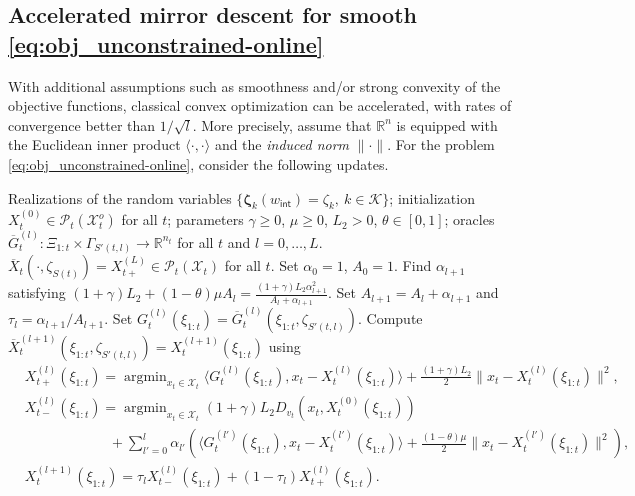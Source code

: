 \documentclass[11pt,fullpage,letterpaper]{article}
\newcommand{\mc}{\mathcal}
\newcommand{\R}{\mathbb{R}}
\newcommand{\bz}{\boldsymbol{\zeta}}
\newcommand{\internal}{\mathsf{int}}
\DeclareMathOperator*{\argmin}{argmin}
\begin{document}
\subsection{Accelerated mirror descent for smooth \eqref{eq:obj_unconstrained-online}}\label{sec:acc_md}
With additional assumptions such as smoothness and/or strong convexity of the objective functions, classical convex optimization can be accelerated, with rates of convergence better than $1/\sqrt{l}$. More precisely, assume that $\R^{n}$ is equipped with the Euclidean inner product $\langle\cdot,\cdot\rangle$ and the \textit{induced norm} $\|\cdot\|$. For the problem \eqref{eq:obj_unconstrained-online}, consider the following updates.


\begin{algorithm}
\caption{Hypothetical accelerated mirror descent update for \eqref{eq:obj_unconstrained-online}}\label{alg:hypo-ms-acc}
\begin{algorithmic}
\Require Realizations of the random variables $\{\bz_k(w_{\internal})= \zeta_k,~k\in \mc K\}$; initialization $X^{(0)}_t\in \mc P_t(\mc X^o_t)$ for all $t$; parameters $\gamma\geq 0$, $\mu \geq0$, $L_2>0$, $\theta\in [0,1]$; oracles $\overline{G}^{(l)}_t:\Xi_{1:t}\times \Gamma_{S'(t,l)}\to \R^{n_t}$ for all $t$ and $l=0,\ldots,L$. 
\Ensure $\overline{X}_t(\cdot,\zeta_{S(t)}) = X_{t+}^{(L)}\in \mc P_t(\mc X_t)$ for all $t$.
\State Set $\alpha_0 = 1$, $A_0 = 1$. 
\State Find $\alpha_{l+1}$ satisfying $(1+\gamma)L_2 + (1-\theta)\mu A_l = \frac{(1+\gamma)L_2\alpha_{l+1}^2}{A_{l}+\alpha_{l+1}}$.
\State Set $A_{l+1} = A_l + \alpha_{l+1}$ and $\tau_l = \alpha_{l+1}/A_{l+1}$. 
\State Set $G_t^{(l)}(\xi_{1:t}) = \overline{G}_t^{(l)}(\xi_{1:t},\zeta_{S'(t,l)})$.
\State Compute $\overline{X}_t^{(l+1)}(\xi_{1:t},\zeta_{S'(t,l)}) = X_{t}^{(l+1)}(\xi_{1:t})$ using
\begin{align}\label{eq:update_acc_inexact}
    & X_{t+}^{(l)}(\xi_{1:t}) = \argmin_{x_t\in \mc X_t}\langle G_{t}^{(l)}(\xi_{1:t}),x_t-X_{t}^{(l)}(\xi_{1:t})\rangle + \frac{(1+\gamma)L_2}{2}\|x_t-X_{t}^{(l)}(\xi_{1:t})\|^2,\nonumber\\
    & X_{t-}^{(l)}(\xi_{1:t}) = \argmin_{x_t\in \mc X_t} (1+\gamma) L_2D_{v_t}(x_t,X_{t}^{(0)}(\xi_{1:t})) \nonumber\\
    &\qquad\qquad\qquad + \sum_{l'=0}^{l} \alpha_{l'}(\langle G_{t}^{(l')}(\xi_{1:t}),x_t-X_{t}^{(l')}(\xi_{1:t})\rangle + \frac{(1-\theta)\mu}{2}\|x_t-X_{t}^{(l')}(\xi_{1:t})\|^2),\nonumber\\
    &X_{t}^{(l+1)}(\xi_{1:t}) = \tau_l X_{t-}^{(l)}(\xi_{1:t}) + (1-\tau_l)X_{t+}^{(l)}(\xi_{1:t}).
\end{align}
\EndFor
\EndFor
\end{algorithmic}
\end{algorithm}
\end{document}
